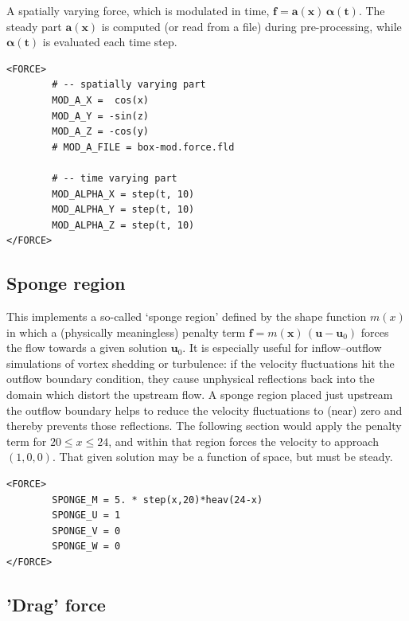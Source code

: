 \documentclass[11pt]{report}
\begin{document}
A spatially varying force, which is modulated in time, $\bm{f} =
\bm{a}(\bm{x}) \, \bm{\alpha(t)} $. The steady part $\bm{a}(\bm{x})$ is
computed (or read from a file) during pre-processing, while
$\bm{\alpha(t)}$ is evaluated each time step.
\begin{verbatim}
<FORCE>
        # -- spatially varying part
        MOD_A_X =  cos(x)
        MOD_A_Y = -sin(z)
        MOD_A_Z = -cos(y)
        # MOD_A_FILE = box-mod.force.fld

        # -- time varying part
        MOD_ALPHA_X = step(t, 10)
        MOD_ALPHA_Y = step(t, 10)
        MOD_ALPHA_Z = step(t, 10)
</FORCE>
\end{verbatim}

\subsection{Sponge region}
\label{sec.sponge}

This implements a so-called `sponge region' defined by the shape
function $m(x)$ in which a (physically meaningless) penalty term
$\bm{f} = m(\bm{x}) \, (\bm{u} - \bm{u}_0)$ forces the flow towards a
given solution $\bm{u}_0$.  It is especially useful for
inflow--outflow simulations of vortex shedding or turbulence: if the
velocity fluctuations hit the outflow boundary condition, they cause
unphysical reflections back into the domain which distort the upstream
flow. A sponge region placed just upstream the outflow boundary helps
to reduce the velocity fluctuations to (near) zero and thereby prevents
those reflections. The following section would apply the penalty term
for $20 \le x \le 24$, and within that region forces the velocity to
approach~$(1, 0, 0).$ That given solution may be a function of space,
but must be steady.
\begin{verbatim}
<FORCE>
        SPONGE_M = 5. * step(x,20)*heav(24-x)
        SPONGE_U = 1
        SPONGE_V = 0
        SPONGE_W = 0
</FORCE>
\end{verbatim}

\subsection{'Drag' force}
\end{document}
